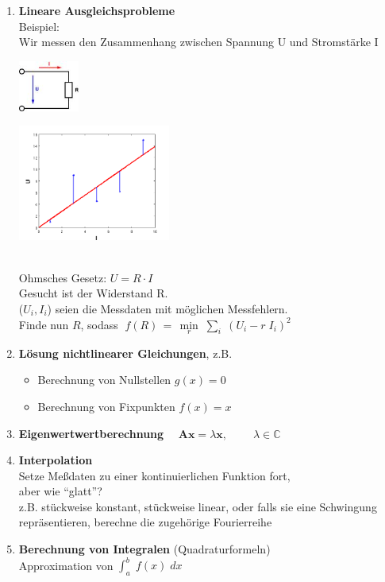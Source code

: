 \documentclass[ngerman,fontsize=11pt, paper=a4, parskip=half, titlepage=true, toc=bib]{scrbook}
\theoremstyle{definition}
\theoremstyle{plain}
\begin{document}
\begin{enumerate}
\item \textbf{Lineare Ausgleichsprobleme}\\
  Beispiel:\\
  Wir messen den Zusammenhang zwischen Spannung U und
  Stromstärke I\\
  \parbox[c]{3cm}{\includegraphics[width=2cm]{images/ohmsche.jpeg} }
  \parbox[c]{6cm}{\includegraphics[width=5cm]{images/linausgl2.png}} \\
  Ohmsches Gesetz: $U = R \cdot I$\\
  Gesucht ist der Widerstand R. \\
  ($U_i, I_i$) seien die Messdaten mit möglichen Messfehlern.\\
  Finde nun $R$, sodass 
  $\; f(R)\, =\,  \min\limits_r \; \sum\limits_i \; (U_i - r \; I_i)^2$
  
\item \textbf{Lösung nichtlinearer Gleichungen},
  z.B.
  \begin{itemize}
  \item Berechnung von Nullstellen $g(x) = 0$
  \item Berechnung von Fixpunkten $f(x) = x$
  \end{itemize}  
\item \textbf{Eigenwertwertberechnung}
  $\quad \boldsymbol A \boldsymbol x =   \lambda \boldsymbol x, \qquad \; \lambda \in \mathbb{C}$
  
  
\item \textbf{Interpolation}\\
  Setze Meßdaten zu einer kontinuierlichen Funktion fort, \\
  aber wie \enquote{glatt}?\\
  z.B. stückweise konstant, stückweise linear, oder 
  falls sie
  eine Schwingung repräsentieren, berechne die zugehörige
  Fourierreihe  
  
\item \textbf{Berechnung von Integralen} (Quadraturformeln) \\ 
  Approximation von $\int_a^b \; f(x) \; dx$
\end{enumerate}~\\
\end{document}
